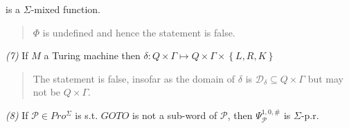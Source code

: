 \documentclass[a4paper, 12pt]{article}
\begin{document}
is a $\Sigma$-mixed function. 


\small
\begin{quote}

$\Phi$ is undefined and hence the statement is false. 

\end{quote}
\normalsize



\textit{(7)} If $M$ a Turing machine then $\delta : Q \times \Gamma \mapsto Q
\times \Gamma \times \left\{ L, R, K \right\} $


\small
\begin{quote}

The statement is false, insofar as the domain of $\delta$ is $\mathcal{D}_\delta
\subseteq Q \times \Gamma$ but may not be $Q \times \Gamma$.

\end{quote}
\normalsize



\textit{(8)} If $\mathcal{P} \in Pro^{\Sigma}$ is s.t. $GOTO$ is not a sub-word
of $\mathcal{P}$, then $\Psi_{\mathcal{P}}^{1, 0, \#}$ is $\Sigma$-p.r. 
\end{document}
